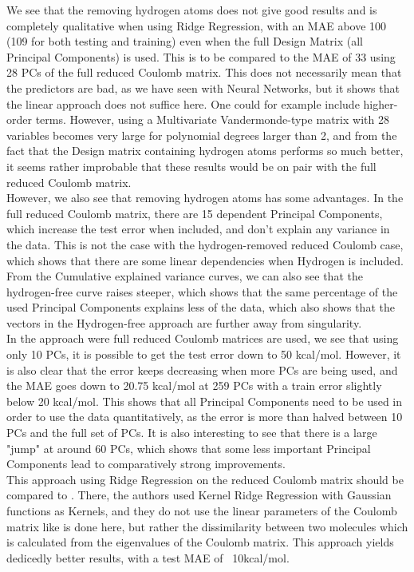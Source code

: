 \documentclass[11pt,a4paper,notitlepage]{article}
\begin{document}
We see that the removing hydrogen atoms does not give good results and is completely qualitative when using Ridge Regression, with an MAE above 100 (109 for both testing and training) even when the full Design Matrix (all Principal Components) is used. This is to be compared to the MAE of 33 using 28 PCs of the full reduced Coulomb matrix.  This does not necessarily mean that the predictors are bad, as we have seen with Neural Networks, but it shows that the linear approach does not suffice here. One could for example include higher-order terms. However, using a Multivariate Vandermonde-type matrix with 28 variables becomes very large for polynomial degrees larger than 2, and from the fact that the Design matrix containing hydrogen atoms performs so much better, it seems rather improbable that these results would be on pair with the full reduced Coulomb matrix. \\
However, we also see that removing hydrogen atoms has some advantages. In the full reduced Coulomb matrix, there are 15 dependent Principal Components, which increase the test error when included, and don't explain any variance in the data. This is not the case with the hydrogen-removed reduced Coulomb case, which shows that there are some linear dependencies when Hydrogen is included. From the Cumulative explained variance curves, we can also see that the hydrogen-free curve raises steeper, which shows that the same percentage of the used Principal Components explains less of the data, which also shows that the vectors in the Hydrogen-free approach are further away from singularity. \\
In the approach were full reduced Coulomb matrices are used, we see that using only 10 PCs, it is possible to get the test error down to 50 kcal/mol. However, it is also clear that the error keeps decreasing when more PCs are being used, and the MAE goes down to 20.75 kcal/mol at 259 PCs with a train error slightly below 20 kcal/mol. This shows that all Principal Components need to be used in order to use the data quantitatively, as the error is more than halved between 10 PCs and the full set of PCs. It is also interesting to see that there is a large "jump" at around 60 PCs, which shows that some less important Principal Components lead to comparatively strong improvements.\\

This approach using Ridge Regression on the reduced Coulomb matrix should be compared to \citep{Atomization_Ridge}. There, the authors used Kernel Ridge Regression with Gaussian functions as Kernels, and they do not use the linear parameters of the Coulomb matrix like is done here, but rather the dissimilarity between two molecules which is calculated from the eigenvalues of the Coulomb matrix. This approach yields dedicedly better results, with a test MAE of ~10kcal/mol.
\end{document}
